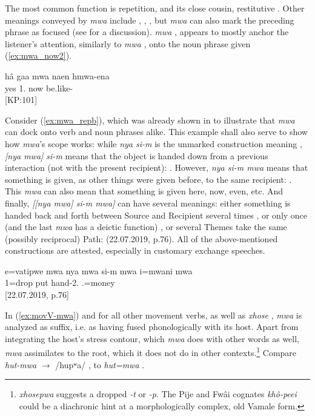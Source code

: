 The most common function is repetition, and its close cousin, restitutive . Other meanings conveyed by \textit{mwa} include , , , but \textit{mwa} can also mark the preceding phrase as focused (see  for a discussion). \textit{mwa} , appears to mostly anchor the listener's attention, similarly to \textit{mwa} , onto the noun phrase given (\ref{ex:mwa_now2}). 

\ea \label{ex:mwa_now2}
\gll hâ gaa mwa naen hmwa-ena\\
 yes 1.  now be.like-\\
\glt {} {[KP:101]}
\z

Consider (\ref{ex:mwa_repb}), which was already shown in  to illustrate that \textit{mwa} can dock onto verb and noun phrases alike. This example shall also serve to show how \textit{mwa}'s scope works: while \textit{nya si-m}  is the unmarked construction meaning , \textit{[nya mwa] si-m} means that the object is handed down from a previous interaction (not with the present recipient): . However, \textit{nya si-m mwa} means that something is given, as other things were given before, to the same recipient: . This \textit{mwa} can also mean that something is given here, now, even, etc. And finally, \textit{[[nya mwa] si-m mwa]} can have several meanings: either something is handed back and forth between Source and Recipient several times , or only once (and the last \textit{mwa} has a deictic function) , or several Themes take the same (possibly reciprocal) Path:  (22.07.2019, p.76). All of the above-mentioned constructions are attested, especially in customary exchange speeches.


\ea \label{ex:mwa_repb}
\gll e=vatipwe mwa nya mwa si-m mwa i=mwani mwa\\
 1=drop  put  hand-2.  .=money \\
\glt {} {[22.07.2019, p.76]}
\z

In (\ref{ex:movV-mwa}) and for all other movement verbs, as well as \textit{xhose} , \textit{mwa} is analyzed as suffix, i.e. as having fused phonologically with its host. Apart from integrating the host's stress contour, which \textit{mwa} does with other words as well, \textit{mwa} assimilates to the root, which it does not do in other contexts.\footnote{\textit{xhosepwa} suggests a dropped \textit{-t} or \textit{-p}. The Pije and Fwâi cognates \textit{khô-peei}  \parencite[155]{haudricourt_dictionnaire_1982} could be a diachronic hint at a morphologically complex, old Vamale form.} Compare \textit{hut-mwa} $\rightarrow$ /hupʷa/ , to \textit{hut=mwa} . 



